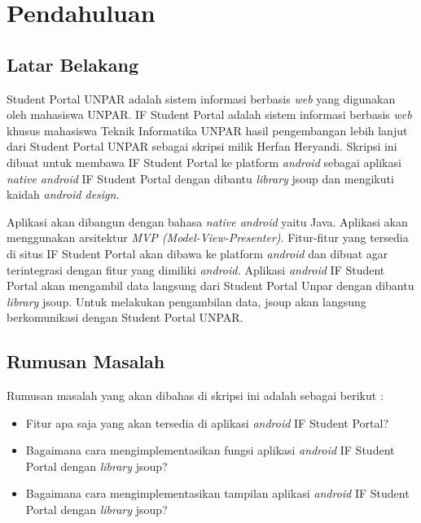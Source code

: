 \chapter{Pendahuluan}
\label{chap:intro}
   
\section{Latar Belakang}
\label{sec:label}

Student Portal UNPAR adalah sistem informasi berbasis \textit{web} yang digunakan oleh mahasiswa UNPAR. IF Student Portal adalah sistem informasi berbasis \textit{web} khusus mahasiswa Teknik Informatika UNPAR hasil pengembangan  lebih lanjut dari Student Portal UNPAR sebagai skripsi milik Herfan Heryandi. Skripsi ini dibuat untuk membawa IF Student Portal ke platform \textit{android} sebagai aplikasi \textit{native android} IF Student Portal dengan dibantu \textit{library} jsoup dan mengikuti kaidah \textit{android design}. 

 Aplikasi akan dibangun dengan bahasa \textit{native android} yaitu Java. Aplikasi akan menggunakan arsitektur \textit{MVP (Model-View-Presenter)}. Fitur-fitur yang tersedia di situs IF Student Portal akan dibawa ke platform \textit{android} dan dibuat agar terintegrasi dengan fitur yang dimiliki \textit{android.} Aplikasi \textit{android} IF Student Portal akan mengambil data langsung dari Student Portal Unpar dengan dibantu \textit{library} jsoup. Untuk melakukan pengambilan data, jsoup akan langsung berkomunikasi dengan Student Portal UNPAR.  


\section{Rumusan Masalah}
\label{sec:rumusan}
Rumusan masalah yang akan dibahas di skripsi ini adalah sebagai berikut :
\begin{itemize}
    \item Fitur apa saja yang akan tersedia di aplikasi \textit{android} IF Student Portal?
    \item Bagaimana cara mengimplementasikan fungsi aplikasi \textit{android} IF Student Portal dengan \textit{library} jsoup?
    \item Bagaimana cara mengimplementasikan tampilan aplikasi \textit{android} IF Student Portal dengan \textit{library} jsoup?
\end{itemize}

